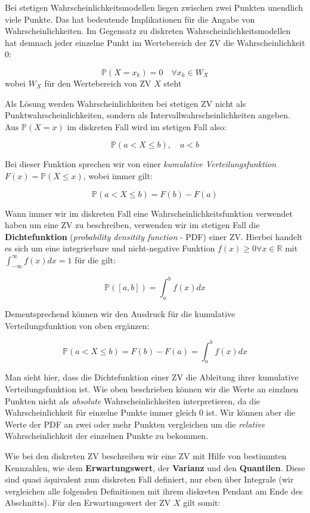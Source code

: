 \documentclass[]{book}
\begin{document}
Bei stetigen Wahrscheinlichkeitsmodellen liegen zwischen zwei Punkten
unendlich viele Punkte. Das hat bedeutende Implikationen für die Angabe
von Wahrscheinlichkeiten. Im Gegensatz zu diskreten
Wahrscheinlichkeitsmodellen hat demnach jeder einzelne Punkt im
Wertebereich der ZV die Wahrscheinlichkeit 0:

\[\mathbb{P}(X=x_k)=0 \quad \forall x_k \in W_X\] wobei \(W_X\) für den
Wertebereich von ZV \(X\) steht

Als Lösung werden Wahrscheinlichkeiten bei stetigen ZV nicht als
Punktwahrscheinlichkeiten, sondern als Intervallwahrscheinlichkeiten
angeben. Aus \(\mathbb{P}(X=x)\) im diskreten Fall wird im stetigen Fall
also:

\[\mathbb{P}(a<X\leq b), \quad a<b\]

Bei dieser Funktion sprechen wir von einer \emph{kumulative
Verteilungsfunktion} \(F(x)=\mathbb{P}(X\leq x)\), wobei immer gilt:

\[\mathbb{P}(a<X\leq b) = F(b)-F(a)\]

Wann immer wir im diskreten Fall eine Wahrscheinlichkeitsfunktion
verwendet haben um eine ZV zu beschreiben, verwenden wir im stetigen
Fall die \textbf{Dichtefunktion} (\emph{probability densitity function}
- PDF) einer ZV. Hierbei handelt es sich um eine integrierbare und
nicht-negative Funktion \(f(x)\geq 0 \forall x\in \mathbb{R}\) mit
\(\int_{-\infty}^{\infty}f(x)dx=1\) für die gilt:

\[\mathbb{P}([a,b])=\int_a^bf(x)dx\]

Dementsprechend können wir den Ausdruck für die kumulative
Verteilungsfunktion von oben ergänzen:

\[\mathbb{P}(a<X\leq b) = F(b)-F(a)=\int_a^bf(x)dx\]

Man sieht hier, dass die Dichtefunktion einer ZV die Ableitung ihrer
kumulative Verteilungsfunktion ist. Wie oben beschrieben können wir die
Werte an einzlnen Punkten nicht als \emph{absolute} Wahrscheinlichkeiten
interpretieren, da die Wahrscheinlichkeit für einzelne Punkte immer
gleich 0 ist. Wir können aber die Werte der PDF an zwei oder mehr
Punkten vergleichen um die \emph{relative} Wahrscheinlichkeit der
einzelnen Punkte zu bekommen.

Wie bei den diskreten ZV beschreiben wir eine ZV mit Hilfe von
bestimmten Kennzahlen, wie dem \textbf{Erwartungswert}, der
\textbf{Varianz} und den \textbf{Quantilen}. Diese sind quasi äquivalent
zum diskreten Fall definiert, nur eben über Integrale (wir vergleichen
alle folgenden Definitionen mit ihrem diskreten Pendant am Ende des
Abschnitts). Für den Erwartungswert der ZV \(X\) gilt somit:
\end{document}
